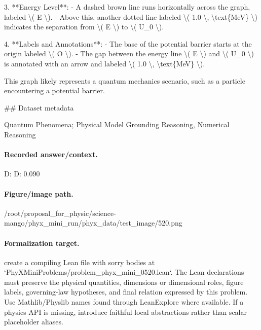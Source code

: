 3. **Energy Level**:
   - A dashed brown line runs horizontally across the graph, labeled \textbackslash{}( E \textbackslash{}).
   - Above this, another dotted line labeled \textbackslash{}( 1.0 \textbackslash{}, \textbackslash{}text\{MeV\} \textbackslash{}) indicates the separation from \textbackslash{}( E \textbackslash{}) to \textbackslash{}( U\_0 \textbackslash{}).

4. **Labels and Annotations**:
   - The base of the potential barrier starts at the origin labeled \textbackslash{}( O \textbackslash{}).
   - The gap between the energy line \textbackslash{}( E \textbackslash{}) and \textbackslash{}( U\_0 \textbackslash{}) is annotated with an arrow and labeled \textbackslash{}( 1.0 \textbackslash{}, \textbackslash{}text\{MeV\} \textbackslash{}). 

This graph likely represents a quantum mechanics scenario, such as a particle encountering a potential barrier.

\#\# Dataset metadata

Quantum Phenomena; Physical Model Grounding Reasoning, Numerical Reasoning

\paragraph{Recorded answer/context.}
D: D: 0.090

\paragraph{Figure/image path.}
/root/proposal\_for\_physic/science-mango/phyx\_mini\_run/phyx\_data/test\_image/520.png

\paragraph{Formalization target.}
create a compiling Lean file with sorry bodies at `PhyXMiniProblems/problem\_phyx\_mini\_0520.lean`. The Lean declarations must preserve the physical quantities, dimensions or dimensional roles, figure labels, governing-law hypotheses, and final relation expressed by this problem.
Use Mathlib/Physlib names found through LeanExplore where available. If a physics API is missing, introduce faithful local abstractions rather than scalar placeholder aliases.

